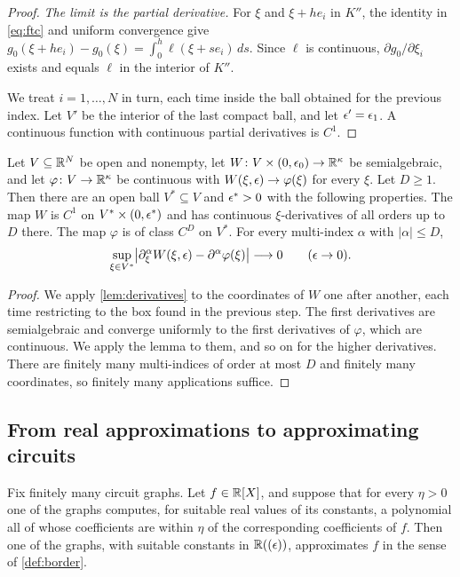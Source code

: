 \begin{proof}
\emph{The limit is the partial derivative.} For $\xi$ and $\xi+he_i$ in $K''$, the identity in \eqref{eq:ftc} and uniform convergence give $g_0(\xi+he_i)-g_0(\xi)=\int_0^h\ell(\xi+se_i)\,ds$. Since $\ell$ is continuous, $\partial g_0/\partial\xi_i$ exists and equals $\ell$ in the interior of $K''$.

We treat $i=1,\dots,N$ in turn, each time inside the ball obtained for the previous index. Let $V'$ be the interior of the last compact ball, and let $\epsilon'=\epsilon_1$. A continuous function with continuous partial derivatives is $C^1$.
\end{proof}

\begin{corollary}\label{cor:derivatives}
Let $V\subseteq\mathbb{R}^N$ be open and nonempty, let $W\colon V\times(0,\epsilon_0)\to\mathbb{R}^\kappa$ be semialgebraic, and let $\varphi\colon V\to\mathbb{R}^\kappa$ be continuous with $W(\xi,\epsilon)\to\varphi(\xi)$ for every $\xi$. Let $D\ge1$. Then there are an open ball $V^*\subseteq V$ and $\epsilon^*>0$ with the following properties. The map $W$ is $C^1$ on $V^*\times(0,\epsilon^*)$ and has continuous $\xi$-derivatives of all orders up to $D$ there. The map $\varphi$ is of class $C^D$ on $V^*$. For every multi-index $\alpha$ with $|\alpha|\le D$,
\[
\sup_{\xi\in V^*}\bigl|\partial_\xi^\alpha W(\xi,\epsilon)-\partial^\alpha\varphi(\xi)\bigr|\longrightarrow0\qquad(\epsilon\to0).
\]
\end{corollary}

\begin{proof}
We apply \cref{lem:derivatives} to the coordinates of $W$ one after another, each time restricting to the box found in the previous step. The first derivatives are semialgebraic and converge uniformly to the first derivatives of $\varphi$, which are continuous. We apply the lemma to them, and so on for the higher derivatives. There are finitely many multi-indices of order at most $D$ and finitely many coordinates, so finitely many applications suffice.
\end{proof}

\subsection{From real approximations to approximating circuits}

\begin{lemma}\label{lem:closure}
Fix finitely many circuit graphs. Let $f\in\mathbb{R}[X]$, and suppose that for every $\eta>0$ one of the graphs computes, for suitable real values of its constants, a polynomial all of whose coefficients are within $\eta$ of the corresponding coefficients of $f$. Then one of the graphs, with suitable constants in $\mathbb{R}((\epsilon))$, approximates $f$ in the sense of \cref{def:border}.
\end{lemma}

